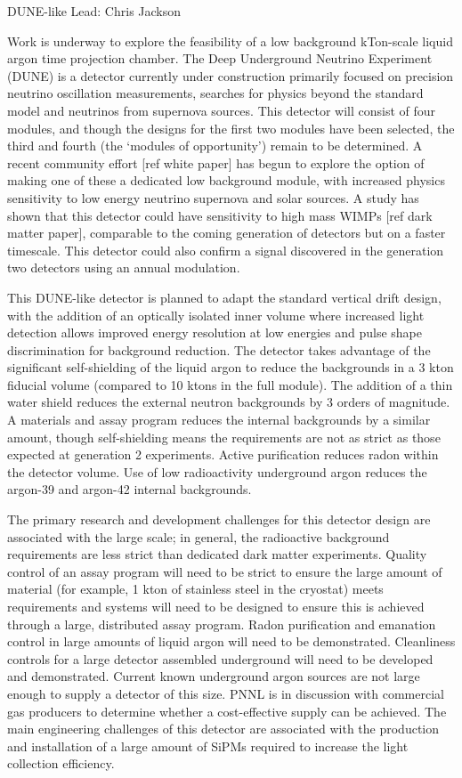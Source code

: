 DUNE-like Lead: Chris Jackson

Work is underway to explore the feasibility of a low background kTon-scale liquid argon time projection chamber. The Deep Underground Neutrino Experiment (DUNE) is a detector currently under construction primarily focused on precision neutrino oscillation measurements, searches for physics beyond the standard model and neutrinos from supernova sources. This detector will consist of four modules, and though the designs for the first two modules have been selected, the third and fourth (the `modules of opportunity’) remain to be determined. A recent community effort [ref white paper] has begun to explore the option of making one of these a dedicated low background module, with increased physics sensitivity to low energy neutrino supernova and solar sources. A study has shown that this detector could have sensitivity to high mass WIMPs [ref dark matter paper], comparable to the coming generation of detectors but on a faster timescale. This detector could also confirm a signal discovered in the generation two detectors using an annual modulation.  

This DUNE-like detector is planned to adapt the standard vertical drift design, with the addition of an optically isolated inner volume where increased light detection allows improved energy resolution at low energies and pulse shape discrimination for background reduction. The detector takes advantage of the significant self-shielding of the liquid argon to reduce the backgrounds in a 3 kton fiducial volume (compared to 10 ktons in the full module). The addition of a thin water shield reduces the external neutron backgrounds by 3 orders of magnitude. A materials and assay program reduces the internal backgrounds by a similar amount, though self-shielding means the requirements are not as strict as those expected at generation 2 experiments. Active purification reduces radon within the detector volume. Use of low radioactivity underground argon reduces the argon-39 and argon-42 internal backgrounds.

The primary research and development challenges for this detector design are associated with the large scale; in general, the radioactive background requirements are less strict than dedicated dark matter experiments. Quality control of an assay program will need to be strict to ensure the large amount of material (for example, 1 kton of stainless steel in the cryostat) meets requirements and systems will need to be designed to ensure this is achieved through a large, distributed assay program. Radon purification and emanation control in large amounts of liquid argon will need to be demonstrated. Cleanliness controls for a large detector assembled underground will need to be developed and demonstrated. Current known underground argon sources are not large enough to supply a detector of this size. PNNL is in discussion with commercial gas producers to determine whether a cost-effective supply can be achieved. The main engineering challenges of this detector are associated with the production and installation of a large amount of SiPMs required to increase the light collection efficiency.

